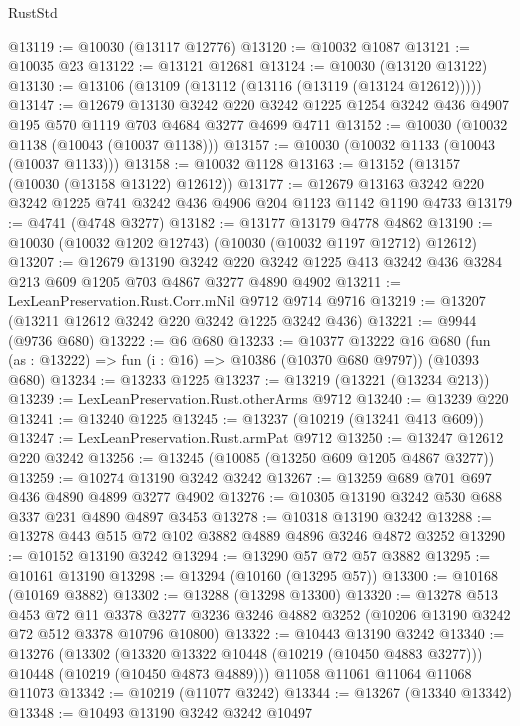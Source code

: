 \begin{lexlean}{RustStd}
\begin{coremodule}
@13119 := @10030 (@13117 @12776)
@13120 := @10032 @1087
@13121 := @10035 @23
@13122 := @13121 @12681
@13124 := @10030 (@13120 @13122)
@13130 := @13106 (@13109 (@13112 (@13116 (@13119 (@13124 @12612)))))
@13147 := @12679
    @13130
    @3242
    @220
    @3242
    @1225
    @1254
    @3242
    @436
    @4907
    @195
    @570
    @1119
    @703
    @4684
    @3277
    @4699
    @4711
@13152 := @10030 (@10032 @1138 (@10043 (@10037 @1138)))
@13157 := @10030 (@10032 @1133 (@10043 (@10037 @1133)))
@13158 := @10032 @1128
@13163 := @13152 (@13157 (@10030 (@13158 @13122) @12612))
@13177 := @12679 @13163 @3242 @220 @3242 @1225 @741 @3242 @436 @4906 @204 @1123 @1142 @1190 @4733
@13179 := @4741 (@4748 @3277)
@13182 := @13177 @13179 @4778 @4862
@13190 := @10030 (@10032 @1202 @12743) (@10030 (@10032 @1197 @12712) @12612)
@13207 := @12679
    @13190
    @3242
    @220
    @3242
    @1225
    @413
    @3242
    @436
    @3284
    @213
    @609
    @1205
    @703
    @4867
    @3277
    @4890
    @4902
@13211 := LexLeanPreservation.Rust.Corr.mNil @9712 @9714 @9716
@13219 := @13207 (@13211 @12612 @3242 @220 @3242 @1225 @3242 @436)
@13221 := @9944 (@9736 @680)
@13222 := @6 @680
@13233 := @10377
    @13222
    @16
    @680
    (fun (as : @13222) => fun (i : @16) => @10386 (@10370 @680 @9797))
    (@10393 @680)
@13234 := @13233 @1225
@13237 := @13219 (@13221 (@13234 @213))
@13239 := LexLeanPreservation.Rust.otherArms @9712
@13240 := @13239 @220
@13241 := @13240 @1225
@13245 := @13237 (@10219 (@13241 @413 @609))
@13247 := LexLeanPreservation.Rust.armPat @9712
@13250 := @13247 @12612 @220 @3242
@13256 := @13245 (@10085 (@13250 @609 @1205 @4867 @3277))
@13259 := @10274 @13190 @3242 @3242
@13267 := @13259 @689 @701 @697 @436 @4890 @4899 @3277 @4902
@13276 := @10305 @13190 @3242 @530 @688 @337 @231 @4890 @4897 @3453
@13278 := @10318 @13190 @3242
@13288 := @13278 @443 @515 @72 @102 @3882 @4889 @4896 @3246 @4872 @3252
@13290 := @10152 @13190 @3242
@13294 := @13290 @57 @72 @57 @3882
@13295 := @10161 @13190
@13298 := @13294 (@10160 (@13295 @57))
@13300 := @10168 (@10169 @3882)
@13302 := @13288 (@13298 @13300)
@13320 := @13278
    @513
    @453
    @72
    @11
    @3378
    @3277
    @3236
    @3246
    @4882
    @3252
    (@10206 @13190 @3242 @72 @512 @3378 @10796 @10800)
@13322 := @10443 @13190 @3242
@13340 := @13276
    (@13302
      (@13320 @13322 @10448 (@10219 (@10450 @4883 @3277)))
      @10448
      (@10219 (@10450 @4873 @4889)))
    @11058
    @11061
    @11064
    @11068
    @11073
@13342 := @10219 (@11077 @3242)
@13344 := @13267 (@13340 @13342)
@13348 := @10493 @13190 @3242 @3242 @10497

\end{coremodule}
\end{lexlean}
